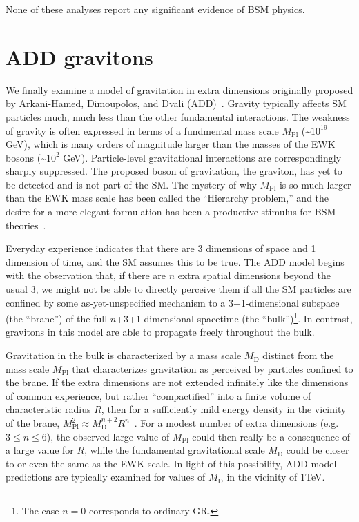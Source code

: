 \documentclass[oneside, letterpaper, 12pt, oldfontcommands]{memoir}
\begin{document}
None of these analyses report any significant evidence of BSM physics.

\section{ADD gravitons} \label{sec:introduction_ADD}
We finally examine a model of gravitation in extra dimensions originally proposed by Arkani-Hamed, Dimoupolos, and Dvali (ADD)~\cite{ref:S0370-2693(98)00466-3}.
Gravity typically affects SM particles much, much less than the other fundamental interactions. The weakness of gravity
is often expressed in terms of a fundmental mass scale $M_\mathrm{Pl}$ (\textasciitilde$10^{19}$ GeV), which is
many orders of magnitude larger than the masses of the EWK bosons (\textasciitilde$10^{2}$ GeV). Particle-level gravitational interactions
are correspondingly sharply suppressed. The proposed boson of gravitation, the graviton, has yet to be detected and is not part of the SM.
The mystery of why $M_\mathrm{Pl}$ is so much larger than the EWK mass scale has been called the ``Hierarchy problem,'' and the desire for a
more elegant formulation has been a productive stimulus for BSM theories~\cite{ref:S0370-2693(98)00466-3, ref:0264-9381/32/3/033001}.

Everyday experience indicates that there are 3 dimensions of space and 1 dimension of time, and the SM assumes this to be true.
The ADD model begins with the observation that, if there are $n$ extra spatial dimensions beyond the usual 3,
we might not be able to directly perceive them if all the SM particles are confined by some as-yet-unspecified
mechanism to a 3+1-dimensional subspace (the ``brane'') of the full $n$+3+1-dimensional spacetime (the ``bulk'')\footnote{The case $n=0$ corresponds
to ordinary GR.}.
In contrast, gravitons in this model are able to propagate freely throughout the bulk.

Gravitation in the bulk is characterized by a mass scale $M_\mathrm{D}$ distinct from the mass scale $M_\mathrm{Pl}$ that
characterizes gravitation as perceived by particles confined to the brane. If the extra dimensions are not extended infinitely like the
dimensions of common experience, but rather ``compactified'' into a finite volume of characteristic radius $R$, then for a sufficiently mild
energy density in the vicinity of the brane, $M_\mathrm{Pl}^{2} \approx M_\mathrm{D}^{n+2} R^{n}$~\cite{ref:S0370-2693(98)00466-3, ref:S0550-3213(99)00044-9}.
For a modest number of extra dimensions (e.g. $3 \leq n \leq 6$), the observed large value of $M_\mathrm{Pl}$ could then really
be a consequence of a large value for $R$, while the fundamental gravitational scale $M_\mathrm{D}$ could be closer to or even
the same as the EWK scale. In light of this possibility, ADD model predictions are typically examined for values of $M_\mathrm{D}$ in the vicinity of 1\unit{TeV}.
\end{document}
